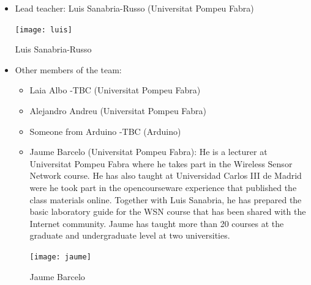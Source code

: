 \documentclass{tufte-book} %
\begin{document}
\begin{itemize}
\item Lead teacher: Luis Sanabria-Russo (Universitat Pompeu Fabra)
\begin{marginfigure}
\texttt{[image: luis]}
\caption{Luis Sanabria-Russo}
\label{fig:luis}
\end{marginfigure}
\item Other members of the team:
\begin{itemize}
\item Laia Albo -TBC (Universitat Pompeu Fabra)
\item Alejandro Andreu (Universitat Pompeu Fabra)
\item Someone from Arduino -TBC (Arduino)
\item Jaume Barcelo (Universitat Pompeu Fabra): He is a lecturer at Universitat Pompeu Fabra where he takes part in the Wireless Sensor Network course. He has also taught at Universidad Carlos III de Madrid were he took part in the opencourseware experience that published the class materials online. Together with Luis Sanabria, he has prepared the basic laboratory guide for the WSN course that has been shared with the Internet community. Jaume has taught more than 20 courses at the graduate and undergraduate level at two universities.
\begin{marginfigure}
\texttt{[image: jaume]}
\caption{Jaume Barcelo}
\label{fig:jaume}
\end{marginfigure}


\end{itemize}
\end{itemize}
\end{document}

